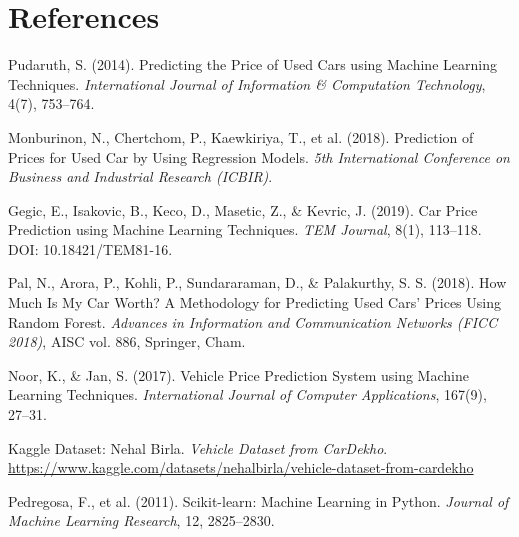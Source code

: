 \documentclass[12pt,a4paper]{report}
\begin{document}
\chapter*{References}
\begin{enumerate}[label={[\arabic*]}, itemsep=3pt]
    \item Pudaruth, S. (2014). Predicting the Price of Used Cars using Machine Learning Techniques. \textit{International Journal of Information \& Computation Technology}, 4(7), 753--764.
    \item Monburinon, N., Chertchom, P., Kaewkiriya, T., et al. (2018). Prediction of Prices for Used Car by Using Regression Models. \textit{5th International Conference on Business and Industrial Research (ICBIR)}.
    \item Gegic, E., Isakovic, B., Keco, D., Masetic, Z., \& Kevric, J. (2019). Car Price Prediction using Machine Learning Techniques. \textit{TEM Journal}, 8(1), 113--118. DOI: 10.18421/TEM81-16.
    \item Pal, N., Arora, P., Kohli, P., Sundararaman, D., \& Palakurthy, S. S. (2018). How Much Is My Car Worth? A Methodology for Predicting Used Cars' Prices Using Random Forest. \textit{Advances in Information and Communication Networks (FICC 2018)}, AISC vol. 886, Springer, Cham.
    \item Noor, K., \& Jan, S. (2017). Vehicle Price Prediction System using Machine Learning Techniques. \textit{International Journal of Computer Applications}, 167(9), 27--31.
    \item Kaggle Dataset: Nehal Birla. \textit{Vehicle Dataset from CarDekho}. \url{https://www.kaggle.com/datasets/nehalbirla/vehicle-dataset-from-cardekho}
    \item Pedregosa, F., et al. (2011). Scikit-learn: Machine Learning in Python. \textit{Journal of Machine Learning Research}, 12, 2825--2830.
\end{enumerate}
\end{document}
